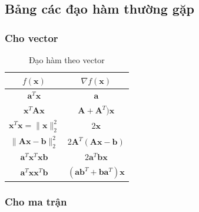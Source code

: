 \documentclass[12pt]{article}
\begin{document}
 
\subsection{Bảng các đạo hàm thường gặp}
 
\subsubsection{Cho vector }
 
\begin{table}[h!]
\centering
\caption{Đạo hàm theo vector}
\label{my-label}
\begin{tabular}{|c|c|}
\hline
$f(\mathbf{x}) $                                                                          & $ \nabla f(\mathbf{x}) $                                         \\ \hline
$\mathbf{a}^T \mathbf{x} $                                                                & $\mathbf{a}$                                                     \\ \hline
$\mathbf{x}^T\mathbf{Ax}$                                                                 & $\mathbf{A} + \mathbf{A}^T) \mathbf{x}$                          \\ \hline
$\mathbf{x}^T \mathbf{x} = \|\mathbf{x}\|_2^2 $ & $2\mathbf{x}$                                                   \\ \hline
$ \|\mathbf{Ax-b} \|_2^2 $                                                                & $ 2\mathbf{A}^T (\mathbf{Ax - b})$                               \\ \hline
$\mathbf{a}^T\mathbf{x}^T\mathbf{xb} $                                                    & $2\mathbf{a}^T\mathbf{bx} $                                      \\ \hline
$\mathbf{a}^T\mathbf{x}\mathbf{x}^T\mathbf{b} $                                           & $ (\mathbf{a}\mathbf{b}^T + \mathbf{b}\mathbf{a}^T) \mathbf{x} $ \\ \hline
\end{tabular}
\end{table}


 
\subsubsection{Cho ma trận}
 
\end{document}

